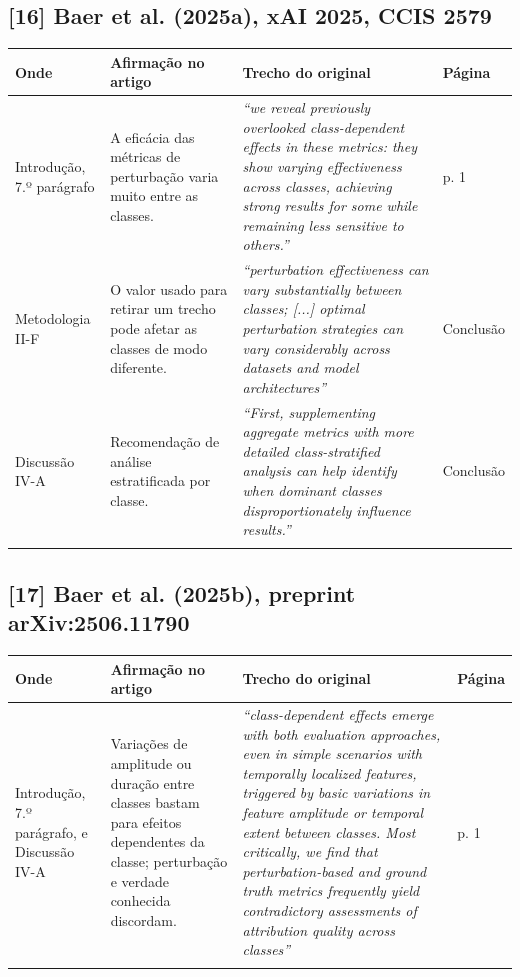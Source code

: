 \documentclass[11pt,a4paper]{article}
\begin{document}
\subsection*{[16] Baer et al. (2025a), xAI 2025, CCIS 2579}
\begin{longtable}{>{\raggedright\arraybackslash}p{2.6cm}>{\raggedright\arraybackslash}p{4.6cm}>{\raggedright\arraybackslash}p{7.6cm}>{\raggedright\arraybackslash}p{1.4cm}}
\toprule
\textbf{Onde} & \textbf{Afirmação no artigo} & \textbf{Trecho do original} & \textbf{Página} \\
\midrule
Introdução, 7.º parágrafo & A eficácia das métricas de perturbação varia muito entre as classes. & \textit{``we reveal previously overlooked class-dependent effects in these metrics: they show varying effectiveness across classes, achieving strong results for some while remaining less sensitive to others.''} & p. 1 \\
\addlinespace
Metodologia II-F & O valor usado para retirar um trecho pode afetar as classes de modo diferente. & \textit{``perturbation effectiveness can vary substantially between classes; [...] optimal perturbation strategies can vary considerably across datasets and model architectures''} & Conclusão \\
\addlinespace
Discussão IV-A & Recomendação de análise estratificada por classe. & \textit{``First, supplementing aggregate metrics with more detailed class-stratified analysis can help identify when dominant classes disproportionately influence results.''} & Conclusão \\
\addlinespace
\bottomrule
\end{longtable}
\subsection*{[17] Baer et al. (2025b), preprint arXiv:2506.11790}
\begin{longtable}{>{\raggedright\arraybackslash}p{2.6cm}>{\raggedright\arraybackslash}p{4.6cm}>{\raggedright\arraybackslash}p{7.6cm}>{\raggedright\arraybackslash}p{1.4cm}}
\toprule
\textbf{Onde} & \textbf{Afirmação no artigo} & \textbf{Trecho do original} & \textbf{Página} \\
\midrule
Introdução, 7.º parágrafo, e Discussão IV-A & Variações de amplitude ou duração entre classes bastam para efeitos dependentes da classe; perturbação e verdade conhecida discordam. & \textit{``class-dependent effects emerge with both evaluation approaches, even in simple scenarios with temporally localized features, triggered by basic variations in feature amplitude or temporal extent between classes. Most critically, we find that perturbation-based and ground truth metrics frequently yield contradictory assessments of attribution quality across classes''} & p. 1 \\
\addlinespace
\bottomrule
\end{longtable}
\end{document}
